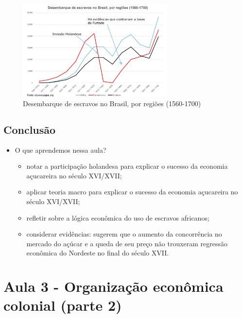 \documentclass[a4paper,12pt]{article}[abntex2]
\begin{document}
\begin{figure}[H]
    \centering
    \includegraphics[width=0.7\textwidth]{Imagens Slides/i3a2.png}
    \caption{Desembarque de escravos no Brasil, por regiões (1560-1700)}
\end{figure}

\subsection{\textbf{Conclusão}}
\begin{itemize}
    \item O que aprendemos nessa aula? \begin{itemize}
        \item notar a participação holandesa para explicar o sucesso da economia açucareira no século XVI/XVII; 
        \item aplicar teoria macro para explicar o sucesso da economia açucareira no século XVI/XVII;
        \item refletir sobre a lógica econômica do uso de escravos africanos;
        \item considerar evidências: sugerem que o aumento da concorrência no mercado do açúcar e a queda de seu preço não trouxeram regressão econômica do Nordeste no final do século XVII.
    \end{itemize}
\end{itemize}
\newpage

\section{\textbf{Aula 3 - Organização econômica colonial (parte 2)}}
\end{document}
